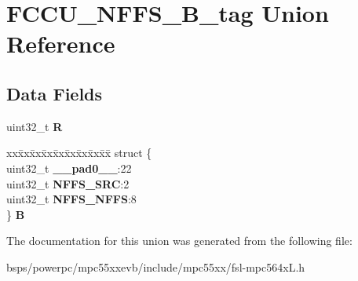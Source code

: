 \hypertarget{unionFCCU__NFFS__32B__tag}{}\section{F\+C\+C\+U\+\_\+\+N\+F\+F\+S\+\_\+B\+\_\+tag Union Reference}
\label{unionFCCU__NFFS__32B__tag}
\subsection*{Data Fields}
\begin{DoxyCompactItemize}
\item 
\mbox{\label{unionFCCU__NFFS__32B__tag_a91ac68361abaf8115a97f7f759158122}} 
uint32\+\_\+t {\bfseries R}
\item 
\mbox{\label{unionFCCU__NFFS__32B__tag_a5ea08c1f841b5e7ef1dd8e8cb9a33e7f}} 
\begin{tabbing}
xx\=xx\=xx\=xx\=xx\=xx\=xx\=xx\=xx\=\kill
struct \{\\
\>uint32\_t {\bfseries \_\_pad0\_\_}:22\\
\>uint32\_t {\bfseries NFFS\_SRC}:2\\
\>uint32\_t {\bfseries NFFS\_NFFS}:8\\
\} {\bfseries B}\\

\end{tabbing}\end{DoxyCompactItemize}


The documentation for this union was generated from the following file\+:\begin{DoxyCompactItemize}
\item 
bsps/powerpc/mpc55xxevb/include/mpc55xx/fsl-\/mpc564x\+L.\+h\end{DoxyCompactItemize}
